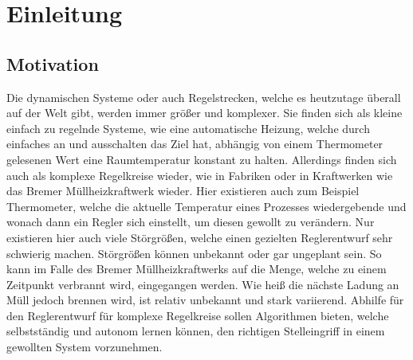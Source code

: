 \documentclass[]{iat}
\begin{document}
\graphicspath{{./project_graphics/}}



\tableofcontents

\newpage

\chapter{Einleitung} \label{sec:einleitung}
\section{Motivation} \label{sec:motivation}
Die dynamischen Systeme oder auch Regelstrecken, welche es heutzutage überall auf der Welt gibt, werden immer größer und komplexer. Sie finden sich als kleine einfach zu regelnde Systeme, wie eine automatische Heizung, welche durch einfaches an und ausschalten das Ziel hat, abhängig von einem Thermometer gelesenen Wert eine Raumtemperatur konstant zu halten. Allerdings finden sich auch als komplexe Regelkreise wieder, wie in Fabriken oder in Kraftwerken wie das Bremer Müllheizkraftwerk wieder. Hier existieren auch zum Beispiel Thermometer, welche die aktuelle Temperatur eines Prozesses wiedergebende und wonach dann ein Regler sich einstellt, um diesen gewollt zu verändern. Nur existieren hier auch viele Störgrößen, welche einen gezielten Reglerentwurf sehr schwierig machen. Störgrößen können unbekannt oder gar ungeplant sein. So kann im Falle des Bremer Müllheizkraftwerks auf die Menge, welche zu einem Zeitpunkt verbrannt wird, eingegangen werden. Wie heiß die nächste Ladung an Müll jedoch brennen wird, ist relativ unbekannt und stark variierend. Abhilfe für den Reglerentwurf für komplexe Regelkreise sollen Algorithmen bieten, welche selbstständig und autonom lernen können, den richtigen Stelleingriff in einem gewollten System vorzunehmen.
\end{document}
